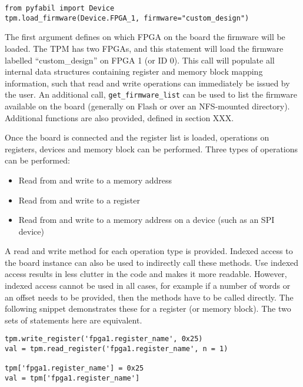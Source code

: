 \documentclass[a4paper,11pt]{article}
\begin{document}
\begin{lstlisting}[belowskip=-1 \baselineskip]
from pyfabil import Device
tpm.load_firmware(Device.FPGA_1, firmware="custom_design")
\end{lstlisting}

The first argument defines on which FPGA on the board the firmware will be 
loaded. The TPM has two FPGAs, and this statement will load the firmware 
labelled ``custom\_design'' on FPGA 1 (or ID 0). This call will populate 
all internal data structures containing register and memory block mapping 
information, such that read and write operations can immediately be issued by 
the user. An additional call, \texttt{get\_firmware\_list} can be used to list 
the firmware available on the board (generally on Flash or over an NFS-mounted 
directory). Additional functions are also provided, defined in section XXX.

Once the board is connected and the register list is loaded, operations on 
registers, devices and memory block can be performed. Three types of operations 
can be performed:
\begin{itemize}
 \item Read from and write to a memory address
 \item Read from and write to a register
 \item Read from and write to a memory address on a device (such as an SPI 
device)
\end{itemize}
A read and write method for each operation type is provided. Indexed access to 
the board instance can also be used to indirectly call these methods. Use 
indexed access results in less clutter in the code and makes it more readable. 
However, indexed access cannot be used in all cases, for example if a number of 
words or an offset needs to be provided, then the methods have to be called 
directly. The following snippet demonstrates these for a register (or memory 
block). The two sets of statements here are equivalent.

\begin{lstlisting}[belowskip=-1 \baselineskip]
tpm.write_register('fpga1.register_name', 0x25)
val = tpm.read_register('fpga1.register_name', n = 1)

tpm['fpga1.register_name'] = 0x25
val = tpm['fpga1.register_name']
\end{lstlisting}
\end{document}
